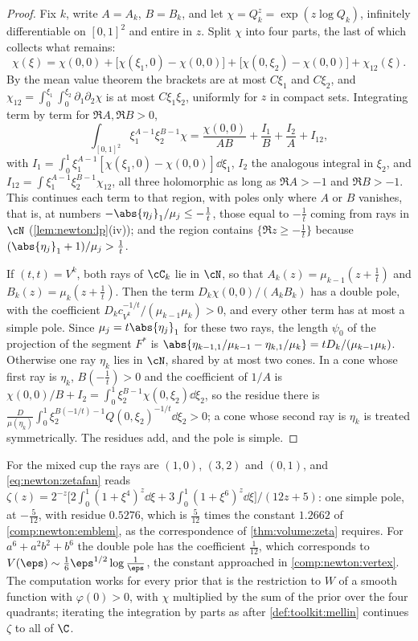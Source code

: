 \begin{refsection}
\begin{proof}
Fix $k$, write $A=A_k$, $B=B_k$, and let $\chi=Q_k^z=\exp(z\log Q_k)$, infinitely differentiable on $[0,1]^2$ and entire in $z$. Split $\chi$ into four parts, the last of which collects what remains:
\[
\chi(\xi)=\chi(0,0)+\bigl[\chi(\xi_1,0)-\chi(0,0)\bigr]+\bigl[\chi(0,\xi_2)-\chi(0,0)\bigr]+\chi_{12}(\xi).
\]
By the mean value theorem the brackets are at most $C\xi_1$ and $C\xi_2$, and $\chi_{12}=\int_0^{\xi_1}\!\int_0^{\xi_2}\partial_1\partial_2\chi$ is at most $C\xi_1\xi_2$, uniformly for $z$ in compact sets. Integrating term by term for $\Re A,\Re B>0$,
\[
\int_{[0,1]^2}\xi_1^{A-1}\xi_2^{B-1}\chi=\frac{\chi(0,0)}{AB}+\frac{I_1}{B}+\frac{I_2}{A}+I_{12},
\]
with $I_1=\int_0^1\xi_1^{A-1}[\chi(\xi_1,0)-\chi(0,0)]\dd\xi_1$, $I_2$ the analogous integral in $\xi_2$, and $I_{12}=\int\xi_1^{A-1}\xi_2^{B-1}\chi_{12}$, all three holomorphic as long as $\Re A>-1$ and $\Re B>-1$. This continues each term to that region, with poles only where $A$ or $B$ vanishes, that is, at numbers $-\abs{\eta_j}_1/\mu_j\le-\frac1t$, those equal to $-\frac1t$ coming from rays in $\cN$ (\cref{lem:newton:lp}(iv)); and the region contains $\{\Re z\ge-\frac1t\}$ because $(\abs{\eta_j}_1+1)/\mu_j>\frac1t$.

If $(t,t)=V^k$, both rays of $\cC_k$ lie in $\cN$, so that $A_k(z)=\mu_{k-1}(z+\frac1t)$ and $B_k(z)=\mu_k(z+\frac1t)$. Then the term $D_k\chi(0,0)/(A_kB_k)$ has a double pole, with the coefficient $D_kc_{V^k}^{-1/t}/(\mu_{k-1}\mu_k)>0$, and every other term has at most a simple pole. Since $\mu_j=t\abs{\eta_j}_1$ for these two rays, the length $\psi_0$ of the projection of the segment $F^*$ is $\abs{\eta_{k-1,1}/\mu_{k-1}-\eta_{k,1}/\mu_k}=tD_k/(\mu_{k-1}\mu_k)$. Otherwise one ray $\eta_k$ lies in $\cN$, shared by at most two cones. In a cone whose first ray is $\eta_k$, $B(-\frac1t)>0$ and the coefficient of $1/A$ is $\chi(0,0)/B+I_2=\int_0^1\xi_2^{B-1}\chi(0,\xi_2)\dd\xi_2$, so the residue there is $\frac{D}{\mu(\eta_k)}\int_0^1\xi_2^{B(-1/t)-1}Q(0,\xi_2)^{-1/t}\dd\xi_2>0$; a cone whose second ray is $\eta_k$ is treated symmetrically. The residues add, and the pole is simple.
\end{proof}

For the mixed cup the rays are $(1,0)$, $(3,2)$ and $(0,1)$, and \eqref{eq:newton:zetafan} reads $\zeta(z)=2^{-z}\bigl[2\int_0^1(1+\xi^4)^z\dd\xi+3\int_0^1(1+\xi^6)^z\dd\xi\bigr]/(12z+5)$: one simple pole, at $-\frac5{12}$, with residue $0.5276$, which is $\frac5{12}$ times the constant $1.2662$ of \cref{comp:newton:emblem}, as the correspondence of \cref{thm:volume:zeta} requires. For $a^6+a^2b^2+b^6$ the double pole has the coefficient $\frac1{12}$, which corresponds to $V(\eps)\sim\frac16\eps^{1/2}\log\frac1\eps$, the constant approached in \cref{comp:newton:vertex}. The computation works for every prior that is the restriction to $W$ of a smooth function with $\varphi(0)>0$, with $\chi$ multiplied by the sum of the prior over the four quadrants; iterating the integration by parts as after \cref{def:toolkit:mellin} continues $\zeta$ to all of $\C$.


\end{refsection}
